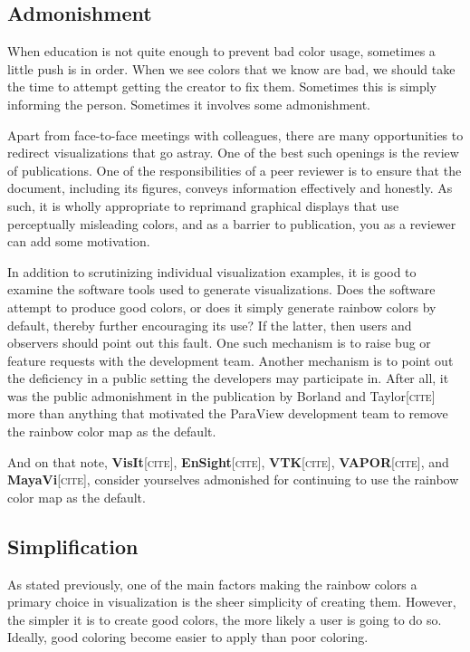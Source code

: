 \documentclass[letterpaper,twocolumn,fleqn]{article}
\newcommand{\fix}[1]{{\color{red}\textsc{[#1]}}}
\begin{document}
\subsection{Admonishment}

\noindent
When education is not quite enough to prevent bad color usage, sometimes a
little push is in order. When we see colors that we know are bad, we should
take the time to attempt getting the creator to fix them. Sometimes this is
simply informing the person. Sometimes it involves some admonishment.

Apart from face-to-face meetings with colleagues, there are many
opportunities to redirect visualizations that go astray. One of the best
such openings is the review of publications. One of the responsibilities of
a peer reviewer is to ensure that the document, including its figures,
conveys information effectively and honestly. As such, it is wholly
appropriate to reprimand graphical displays that use perceptually
misleading colors, and as a barrier to publication, you as a reviewer can
add some motivation.

In addition to scrutinizing individual visualization examples, it is good
to examine the software tools used to generate visualizations. Does the
software attempt to produce good colors, or does it simply generate rainbow
colors by default, thereby further encouraging its use? If the latter, then
users and observers should point out this fault. One such mechanism is to
raise bug or feature requests with the development team. Another mechanism
is to point out the deficiency in a public setting the developers may
participate in. After all, it was the public admonishment in the
publication by Borland and Taylor\fix{cite} more than anything that
motivated the ParaView development team to remove the rainbow color map as
the default.

And on that note, \textbf{VisIt}\fix{cite}, \textbf{EnSight}\fix{cite},
\textbf{VTK}\fix{cite}, \textbf{VAPOR}\fix{cite}, and
\textbf{MayaVi}\fix{cite}, consider yourselves admonished for continuing to
use the rainbow color map as the default.

\subsection{Simplification}

\noindent
As stated previously, one of the main factors making the rainbow colors a
primary choice in visualization is the sheer simplicity of creating them.
However, the simpler it is to create good colors, the more likely a user is
going to do so. Ideally, good coloring become easier to apply than poor
coloring.
\end{document}
